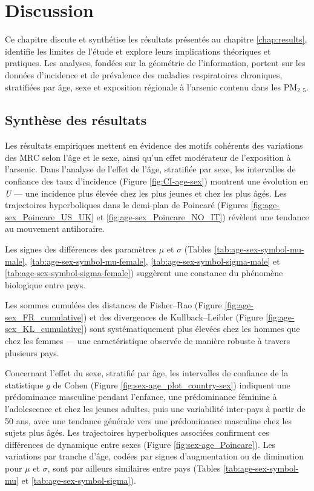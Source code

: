 \chapter{Discussion}
\label{chap:discussion}

Ce chapitre discute et synthétise les résultats présentés au chapitre \ref{chap:results}, identifie les limites de l'étude et explore leurs implications théoriques et pratiques. Les analyses, fondées sur la géométrie de l'information, portent sur les données d'incidence et de prévalence des maladies respiratoires chroniques, stratifiées par âge, sexe et exposition régionale à l'arsenic contenu dans les PM$_{2,5}$.

\section{Synthèse des résultats}

Les résultats empiriques mettent en évidence des motifs cohérents des variations des MRC selon l'âge et le sexe, ainsi qu'un effet modérateur de l'exposition à l'arsenic. Dans l'analyse de l'effet de l'âge, stratifiée par sexe, les intervalles de confiance des taux d'incidence (Figure \ref{fig:CI-age-sex}) montrent une évolution en \emph{U} — une incidence plus élevée chez les plus jeunes et chez les plus âgés. Les trajectoires hyperboliques dans le demi-plan de Poincaré (Figures \ref{fig:age-sex_Poincare_US_UK} et \ref{fig:age-sex_Poincare_NO_IT}) révèlent une tendance au mouvement antihoraire.

Les signes des différences des paramètres $\mu$ et $\sigma$ (Tables \ref{tab:age-sex-symbol-mu-male}, \ref{tab:age-sex-symbol-mu-female}, \ref{tab:age-sex-symbol-sigma-male} et \ref{tab:age-sex-symbol-sigma-female}) suggèrent une constance du phénomène biologique entre pays.

Les sommes cumulées des distances de Fisher–Rao (Figure \ref{fig:age-sex_FR_cumulative}) et des divergences de Kullback–Leibler (Figure \ref{fig:age-sex_KL_cumulative}) sont systématiquement plus élevées chez les hommes que chez les femmes — une caractéristique observée de manière robuste à travers plusieurs pays.

Concernant l'effet du sexe, stratifié par âge, les intervalles de confiance de la statistique $g$ de Cohen (Figure \ref{fig:sex-age_plot_country-sex}) indiquent une prédominance masculine pendant l'enfance, une prédominance féminine à l'adolescence et chez les jeunes adultes, puis une variabilité inter-pays à partir de 50 ans, avec une tendance générale vers une prédominance masculine chez les sujets plus âgés. Les trajectoires hyperboliques associées confirment ces différences de dynamique entre sexes (Figure \ref{fig:sex-age_Poincare}). Les variations par tranche d'âge, codées par signes d'augmentation ou de diminution pour $\mu$ et $\sigma$, sont par ailleurs similaires entre pays (Tables \ref{tab:age-sex-symbol-mu} et \ref{tab:age-sex-symbol-sigma}).

